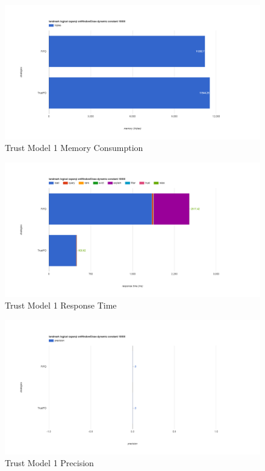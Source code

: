 \begin{figure}[!htbp]
	\centering
    \includegraphics[width=\textwidth]{img/app3-trust-1-m.png}
    \caption{Trust Model 1 Memory Consumption}
\end{figure}
\begin{figure}[!htbp]
	\centering
    \includegraphics[width=\textwidth]{img/app3-trust-1-r.png}
    \caption{Trust Model 1 Response Time}
\end{figure}
\begin{figure}[!htbp]
	\centering
    \includegraphics[width=\textwidth]{img/app3-trust-1-p.png}
    \caption{Trust Model 1 Precision}
\end{figure}
